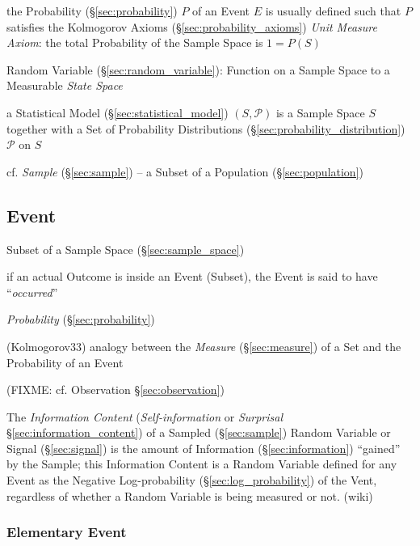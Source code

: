 the Probability (\S\ref{sec:probability}) $P$ of an Event $E$ is usually defined
such that $P$ satisfies the Kolmogorov Axioms (\S\ref{sec:probability_axioms})
\fist \emph{Unit Measure Axiom}: the total Probability of the Sample Space is
$1 = P(S)$

Random Variable (\S\ref{sec:random_variable}): Function on a Sample Space to a
Measurable \emph{State Space}

a Statistical Model (\S\ref{sec:statistical_model}) $(S,\mathcal{P})$ is a
Sample Space $S$ together with a Set of Probability Distributions
(\S\ref{sec:probability_distribution}) $\mathcal{P}$ on $S$

\fist cf. \emph{Sample} (\S\ref{sec:sample}) -- a Subset of a Population
(\S\ref{sec:population})



\subsection{Event}\label{sec:probability_event}

Subset of a Sample Space (\S\ref{sec:sample_space})

if an actual Outcome is inside an Event (Subset), the Event is said to have
``\emph{occurred}''

\emph{Probability} (\S\ref{sec:probability})

(Kolmogorov33) analogy between the \emph{Measure} (\S\ref{sec:measure}) of a Set
and the Probability of an Event

(FIXME: cf. Observation \S\ref{sec:observation})

The \emph{Information Content} (\emph{Self-information} or \emph{Surprisal}
\S\ref{sec:information_content}) of a Sampled (\S\ref{sec:sample}) Random
Variable or Signal (\S\ref{sec:signal}) is the amount of Information
(\S\ref{sec:information}) ``gained'' by the Sample; this Information Content is
a Random Variable defined for any Event as the Negative Log-probability
(\S\ref{sec:log_probability}) of the Vent, regardless of whether a Random
Variable is being measured or not. (wiki)



\subsubsection{Elementary Event}\label{sec:elementary_event}

